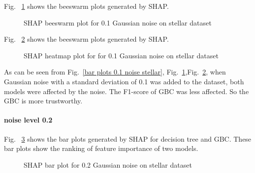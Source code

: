 \documentclass[runningheads,a4paper]{llncs}
\begin{document}
Fig. ~\ref{bee plots 0.1 noise stellar} shows the beeswarm plots generated by SHAP.
\begin{figure}[H]
	\centering
	
	\hfill
	
	
	\caption{SHAP beeswarm plot for 0.1 Gaussian noise on stellar dataset}
	\label{bee plots 0.1 noise stellar}
	
\end{figure}
Fig. ~\ref{heat plots 0.1 noise stellar} shows the beeswarm plots generated by SHAP.
\begin{figure}[H]
	\centering
	
	\hfill
	
	
	\caption{SHAP heatmap plot for for 0.1 Gaussian noise  on stellar dataset}
	\label{heat plots 0.1 noise stellar}
	
\end{figure}


As can be seen from Fig.~\ref{bar plots 0.1 noise stellar}, Fig.~\ref{bee plots 0.1 noise stellar},Fig.~\ref{heat plots 0.1 noise stellar}, when Gaussian noise with a standard deviation of 0.1 was added to the dataset, both models were affected by the noise. The F1-score of GBC was less affected. So the GBC is more trustworthy.

\paragraph{noise level 0.2}
Fig. ~\ref{bar plots 0.2 noise stellar} shows the bar plots generated by SHAP for decision tree and GBC. These bar plots show the ranking of feature importance of two models.
\begin{figure}[H]
	\centering
	
	\hfill
	
	
	\caption{SHAP bar plot for 0.2 Gaussian noise on stellar dataset}
	\label{bar plots 0.2 noise stellar}
\end{figure}
\end{document}
